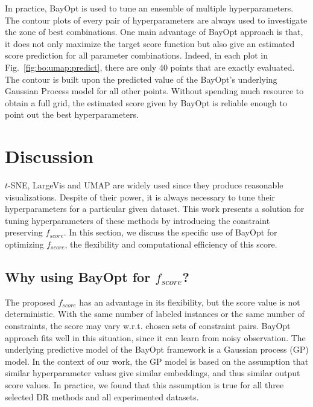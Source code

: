 In practice, BayOpt is used to tune an ensemble of multiple hyperparameters.
The contour plots of every pair of hyperparameters are always used to investigate the zone of best combinations.
One main advantage of BayOpt approach is that, it does not only maximize the target score function but also give an estimated score prediction for all parameter combinations.
Indeed, in each plot in Fig.~\ref{fig:bo:umap:predict}, there are only 40 points that are exactly evaluated.
The contour is built upon the predicted value of the BayOpt's underlying Gaussian Process model for all other points.
Without spending much resource to obtain a full grid, the estimated score given by BayOpt is reliable enough to point out the best hyperparameters.


\section{Discussion}\label{sec:discussion}
$t$-SNE, LargeVis and UMAP are widely used since they produce reasonable visualizations.
Despite of their power, it is always necessary to tune their hyperparameters for a particular given dataset.
This work presents a solution for tuning hyperparameters of these methods by introducing the constraint preserving $f_{score}$.
In this section, we discuss the specific use of BayOpt for optimizing $f_{score}$, the flexibility and computational efficiency of this score.


\subsection{Why using BayOpt for $f_{score}$?}
The proposed $f_{score}$ has an advantage in its flexibility, but the score value is not deterministic.
With the same number of labeled instances or the same number of constraints, the score may vary w.r.t. chosen sets of constraint pairs.
BayOpt approach fits well in this situation, since it can learn from noisy observation.
The underlying predictive model of the BayOpt framework is a Gaussian process (GP) model.
In the context of our work, the GP model is based on the assumption that similar hyperparameter values give similar embeddings, and thus similar output score values.
In practice, we found that this assumption is true for all three selected DR methods and all experimented datasets.

